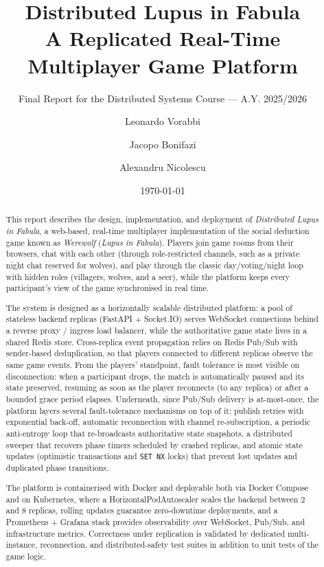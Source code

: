 \documentclass{scrartcl}
\title{\LARGE
    Distributed Lupus in Fabula\\
    A Replicated Real-Time Multiplayer Game Platform
}
\subtitle{Final Report for the Distributed Systems Course --- A.Y. 2025/2026}
\author{
    Leonardo Vorabbi \\ \emailaddr{leonardo.vorabbi@studio.unibo.it}
    \and
    Jacopo Bonifazi \\ \emailaddr{jacopo.bonifazi@studio.unibo.it}
    \and
    Alexandru Nicolescu \\ \emailaddr{alexandru.nicolescu@studio.unibo.it}
}
\date{\today}
\begin{document}
\maketitle

\begin{abstract}
    This report describes the design, implementation, and deployment of
    \emph{Distributed Lupus in Fabula}, a web-based, real-time multiplayer
    implementation of the social deduction game known as
    \emph{Werewolf} (\emph{Lupus in Fabula}).
    Players join game rooms from their browsers, chat with each other
    (through role-restricted channels, such as a private night chat reserved
    for wolves), and play through the classic day/voting/night loop with
    hidden roles (villagers, wolves, and a seer), while the platform keeps
    every participant's view of the game synchronised in real time.

    The system is designed as a horizontally scalable distributed platform:
    a pool of stateless backend replicas (FastAPI + Socket.IO) serves
    WebSocket connections behind a reverse proxy / ingress load balancer,
    while the authoritative game state lives in a shared Redis store.
    Cross-replica event propagation relies on Redis Pub/Sub with
    sender-based deduplication, so that players connected to different
    replicas observe the same game events.
    From the players' standpoint, fault tolerance is most visible on
    disconnection: when a participant drops, the match is automatically paused
    and its state preserved, resuming as soon as the player reconnects (to any
    replica) or after a bounded grace period elapses.
    Underneath, since Pub/Sub delivery is at-most-once, the platform layers several
    fault-tolerance mechanisms on top of it: publish retries with exponential
    back-off, automatic reconnection with channel re-subscription, a periodic
    anti-entropy loop that re-broadcasts authoritative state snapshots, a
    distributed sweeper that recovers phase timers scheduled by crashed
    replicas, and atomic state updates (optimistic transactions and
    \texttt{SET NX} locks) that prevent lost updates and duplicated
    phase transitions.

    The platform is containerised with Docker and deployable both via
    Docker Compose and on Kubernetes, where a HorizontalPodAutoscaler scales
    the backend between 2 and 8 replicas, rolling updates guarantee
    zero-downtime deployments, and a Prometheus + Grafana stack provides
    observability over WebSocket, Pub/Sub, and infrastructure metrics.
    Correctness under replication is validated by dedicated multi-instance,
    reconnection, and distributed-safety test suites in addition to unit
    tests of the game logic.
\end{abstract}
\end{document}
